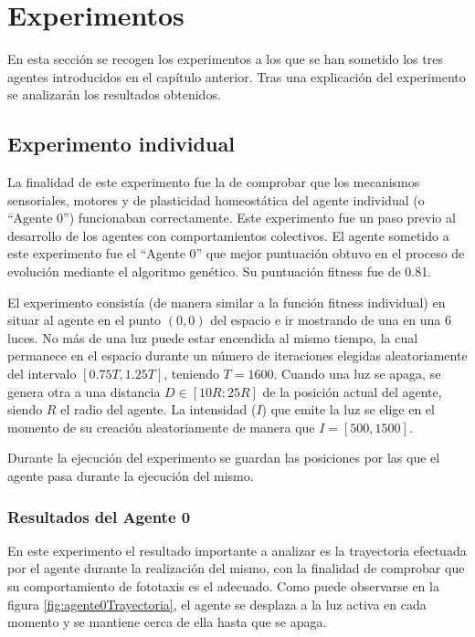 \chapter{Experimentos}
En esta sección se recogen los experimentos a los que se han sometido los tres agentes introducidos en el capítulo anterior. Tras una explicación del experimento se analizarán los resultados obtenidos.
\section{Experimento individual}
La finalidad de este experimento fue la de comprobar que los mecanismos sensoriales, motores y de plasticidad homeostática del agente individual (o ``Agente 0'') funcionaban correctamente. Este experimento fue un paso previo
al desarrollo de los agentes con comportamientos colectivos. El agente sometido a este experimento fue el ``Agente 0'' que mejor puntuación obtuvo en el proceso de evolución mediante el algoritmo genético. Su puntuación fitness fue
de 0.81.

El experimento consistía (de manera similar a la función fitness individual) en situar al agente en el punto $(0,0)$ del espacio e ir mostrando de una en una 6 luces. No más de una luz puede estar encendida al mismo tiempo, la cual permanece en el espacio durante un número
de iteraciones elegidas aleatoriamente del intervalo $[0.75T, 1.25T]$, teniendo $T=1600$. Cuando una luz se apaga, se genera otra a una distancia $D \in [10R:25R]$ de la posición actual del agente, siendo $R$ el radio del agente. La intensidad ($I$) que emite la luz se elige en el momento de su creación aleatoriamente de manera que
$I = [500, 1500]$.

Durante la ejecución del experimento se guardan las posiciones por las que el agente pasa durante la ejecución del mismo.
\subsection{Resultados del Agente 0}
En este experimento el resultado importante a analizar es la trayectoria efectuada por el agente durante la realización del mismo, con la finalidad de comprobar que su comportamiento de fototaxis es el adecuado. Como puede observarse en la figura \ref{fig:agente0Trayectoria}, el agente se desplaza a la luz activa en cada momento
y se mantiene cerca de ella hasta que se apaga.

